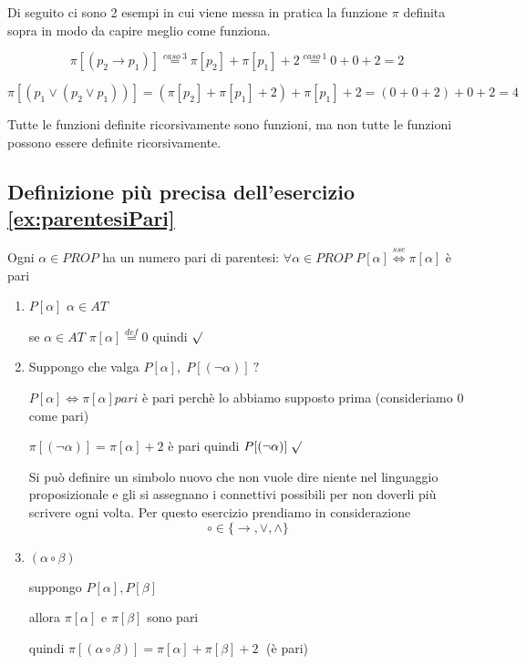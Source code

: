 \documentclass{article}
\theoremstyle{break}
\theoremstyle{break}
\theoremstyle{break}
\theoremstyle{break}
\begin{document}
Di seguito ci sono 2 esempi in cui viene messa in pratica la funzione \( \pi \) definita sopra in
modo da capire meglio come funziona.

\begin{example}
	\[
		\pi[(p_{2}\to p_{1})]\stackrel{caso \:3}{=}\pi[p_{2}]+\pi[p_{1}]+2\stackrel{caso \:1}{=}0+0+2=2
	\]
\end{example}
\begin{example}
	\[
		\pi[(p_{1}\vee (p_{2}\vee p_{1}))] = (\pi[p_{2}] + \pi[p_{1}] + 2) + \pi[p_{1}] + 2 = (0 + 0 + 2) + 0 + 2 = 4
	\]
\end{example}

Tutte le funzioni definite ricorsivamente sono funzioni, ma non tutte le funzioni possono essere definite ricorsivamente.

\subsection{Definizione più precisa dell'esercizio \ref{ex:parentesiPari}}
Ogni \( \alpha \in PROP \) ha un numero pari di parentesi: \( \forall \alpha \in PROP \) \( P[\alpha] \stackrel{sse}{\Leftrightarrow} \pi[\alpha] \) è pari
\begin{enumerate}
	\item \( P[\alpha ] \) \( \alpha \in AT \)

	      se \( \alpha \in AT \! \) \( \pi[\alpha]\stackrel{def}{=}0 \) quindi \( \surd \)
	\item Suppongo che valga \( P[\alpha ],\; P[(\neg \alpha )] \: ? \)

	      \( P[\alpha ] \Leftrightarrow \pi[\alpha ] pari \) è pari perchè lo abbiamo supposto prima (consideriamo 0 come pari)


	      \( \pi[(\neg \alpha )] = \pi [\alpha ] + 2 \) è pari quindi \( P[(\neg \alpha )] \; \surd \)

	      Si può definire un simbolo nuovo che non vuole dire niente nel linguaggio proposizionale e
	      gli si assegnano i connettivi possibili per non doverli più scrivere ogni volta.
	      Per questo esercizio prendiamo in considerazione \[ \circ \in \{\to , \vee, \wedge\} \]

	\item \( (\alpha \circ \beta) \)

	      suppongo \( P[\alpha ], P[\beta ] \)

	      allora \( \pi[\alpha ] \) e \( \pi[\beta ] \) sono pari

	      quindi \( \pi[(\alpha \circ \beta )] = \pi[\alpha ] + \pi[\beta ] + 2 \;\) (è pari)

\end{enumerate}
\end{document}

